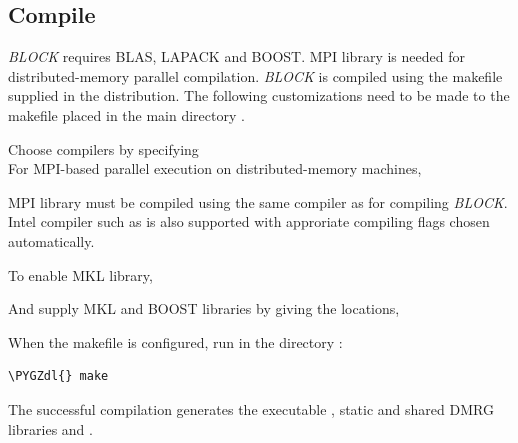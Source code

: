 \documentclass[letterpaper,10pt,english]{sphinxmanual}
\def\PYGZdl{\char`\$}
\begin{document}
\subsection{Compile}
\label{build:compile}
\emph{BLOCK} requires BLAS, LAPACK and BOOST.
MPI library is needed for distributed-memory parallel compilation.
\emph{BLOCK} is compiled using the makefile supplied in the distribution.
The following customizations need to be made to the makefile placed in the main directory .
\begin{description}
\item[{Choose compilers by specifying}] \leavevmode
{}

\item[{For MPI-based parallel execution on distributed-memory machines,}] \leavevmode
{}


\end{description}

MPI library must be compiled using the same compiler as for compiling \emph{BLOCK}.
Intel compiler such as  is also supported with approriate compiling flags chosen automatically.

To enable MKL library,
\begin{quote}

\end{quote}

And supply MKL and BOOST libraries by giving the locations,
\begin{quote}




\end{quote}

When the makefile is configured, run in the directory :

\begin{Verbatim}[commandchars=\\\{\}]
\PYGZdl{} make
\end{Verbatim}

The successful compilation generates the executable , static and shared DMRG libraries  and .
\end{document}
